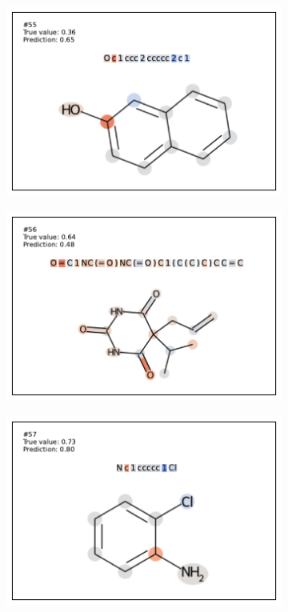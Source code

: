 \begin{figure}[h]
\begin{subfigure}[b]{0.33\textwidth}
\end{subfigure}
\begin{subfigure}[b]{0.33\textwidth} 
  \centering 
  \includegraphics[width=\textwidth]{figures/esol/esol55.pdf} 
\end{subfigure}\begin{subfigure}[b]{0.33\textwidth} 
  \centering 
  \includegraphics[width=\textwidth]{figures/esol/esol56.pdf} 
\end{subfigure}\begin{subfigure}[b]{0.33\textwidth} 
  \centering 
  \includegraphics[width=\textwidth]{figures/esol/esol57.pdf} 

\end{subfigure}
\end{figure}
